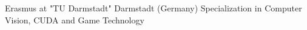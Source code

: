 \documentclass[letterpaper]{twentysecondcv} %
\begin{document}
\begin{twenty}
	{Erasmus at "TU Darmstadt"\footnotemarkA[8]} {Darmstadt (Germany)}
	{Specialization in Computer Vision, CUDA and Game Technology}
\end{twenty}











\end{document}
